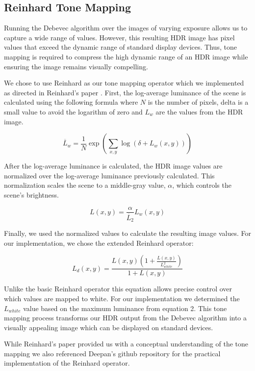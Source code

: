 \documentclass[
	a4paper, %
	10pt, %
	unnumberedsections, %
	twoside, %
]{LTJournalArticle}
\begin{document}
\subsection{Reinhard Tone Mapping}
Running the Debevec algorithm over the images of varying exposure allows us to capture a wide range of values. However, this resulting HDR image has pixel values that exceed the dynamic range of standard display devices. Thus, tone mapping is required to compress the high dynamic range of an HDR image while ensuring the image remains visually compelling. 

We chose to use Reinhard as our tone mapping operator which we implemented as directed in Reinhard's paper \autocite{reinhard2002}. First, the log-average luminance of the scene is calculated using the following formula where $N$ is the number of pixels, delta is a small value to avoid the logarithm of zero and $L_w$ are the values from the HDR image.

\begin{equation}
	\overline{L}_w = \frac{1}{N} \exp\left( \sum_{x,y} \log(\delta + L_w(x,y))\right)
\end{equation}

After the log-average luminance is calculated, the HDR image values are normalized over the log-average luminance previously calculated. This normalization scales the scene to a middle-gray value, $\alpha$, which controls the scene's brightness. 

\begin{equation}
	L(x,y) = \frac{\alpha}{\overline{L}_2} L_w(x,y)
\end{equation}

Finally, we used the normalized values to calculate the resulting image values. For our implementation, we chose the extended Reinhard operator:

\begin{equation}
	L_d(x,y) = \frac{L(x,y)(1 + \frac{L(x,y)}{L^2_{white}})}{1 + L(x,y)}
\end{equation}

Unlike the basic Reinhard operator this equation allows precise control over which values are mapped to white. For our implementation we determined the $L_{white}$ value based on the maximum luminance from equation 2. This tone mapping process transforms our HDR output from the Debevec algorithm into a visually appealing image which can be displayed on standard devices.

While Reinhard’s paper provided us with a conceptual understanding of the tone mapping we also referenced Deepan’s github repository \autocite{chakrabarty2025} for the practical implementation of the Reinhard operator.
\end{document}
